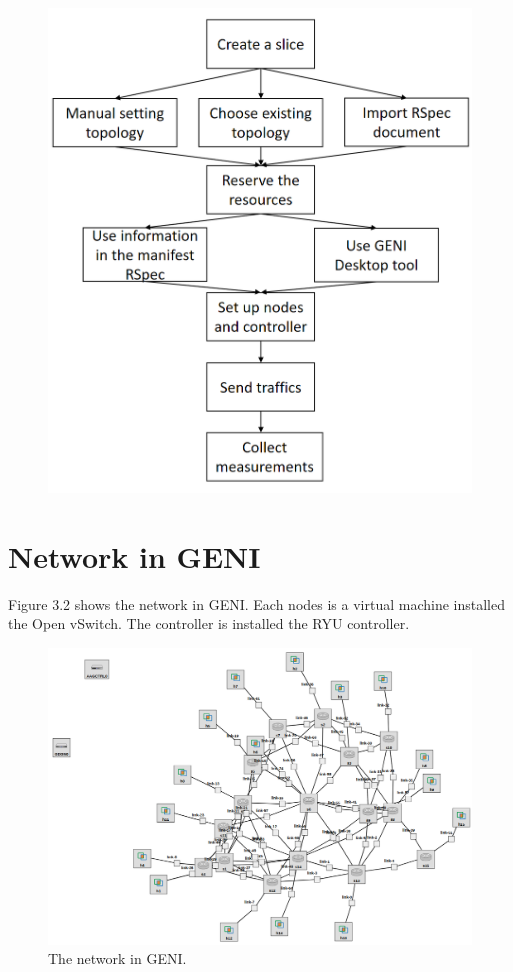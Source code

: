 \documentclass[a4paper,12pt]{report}
\begin{document}
\begin{large}
\begin{figure}
          \includegraphics[width=1.0\textwidth]{geni_workflow.png}
       \end{figure}
	    \section{Network in GENI}
	      \qquad Figure 3.2 shows the network in GENI. Each nodes is a virtual machine installed the Open vSwitch. The controller is installed the RYU controller.
	    \begin{figure}
	          \caption{The network in GENI.}
	          \centering
	          \includegraphics[width=1.0\textwidth]{GENI_network.png}
	       \end{figure}

\end{large}
\end{document}
